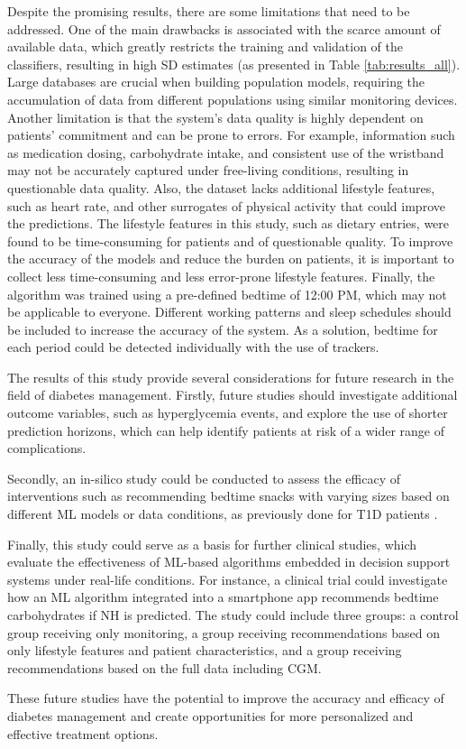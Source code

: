 Despite the promising results, there are some limitations that need to be addressed. 
One of the main drawbacks is associated with the scarce amount of available data, which greatly restricts the training and validation of the classifiers, resulting in high SD estimates (as presented in Table \ref{tab:results_all}). Large databases are crucial when building population models, requiring the accumulation of data from different populations using similar monitoring devices.
Another limitation is that the system's data quality is highly dependent on patients' commitment and can be prone to errors. For example, information such as medication dosing, carbohydrate intake, and consistent use of the wristband may not be accurately captured under free-living conditions, resulting in questionable data quality. 
Also, the dataset lacks additional lifestyle features, such as heart rate, and other surrogates of physical activity that could improve the predictions. The lifestyle features in this study, such as dietary entries, were found to be time-consuming for patients and of questionable quality. To improve the accuracy of the models and reduce the burden on patients, it is important to collect less time-consuming and less error-prone lifestyle features.
Finally, the algorithm was trained using a pre-defined bedtime of 12:00 PM, which may not be applicable to everyone. Different working patterns and sleep schedules should be included to increase the accuracy of the system.  As a solution, bedtime for each period could be detected individually with the use of trackers.

The results of this study provide several considerations for future research in the field of diabetes management. Firstly, future studies should investigate additional outcome variables, such as hyperglycemia events, and explore the use of shorter prediction horizons, which can help identify patients at risk of a wider range of complications.

Secondly, an in-silico study could be conducted to assess the efficacy of interventions such as recommending bedtime snacks with varying sizes based on different ML models or data conditions, as previously done for T1D patients \cite{mosquera2020predicting,parcerisas2022machine}.

Finally, this study could serve as a basis for further clinical studies, which evaluate the effectiveness of ML-based algorithms embedded in decision support systems under real-life conditions. For instance, a clinical trial could investigate how an ML algorithm integrated into a smartphone app recommends bedtime carbohydrates if NH is predicted. The study could include three groups: a control group receiving only monitoring, a group receiving recommendations based on only lifestyle features and patient characteristics, and a group receiving recommendations based on the full data including CGM.

These future studies have the potential to improve the accuracy and efficacy of diabetes management and create opportunities for more personalized and effective treatment options.

